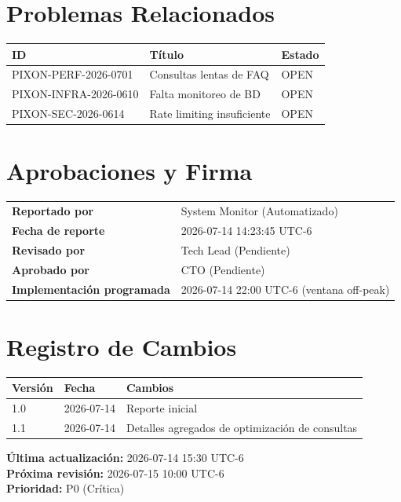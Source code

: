 \documentclass[12pt,a4paper]{article}
\begin{document}
\section{Problemas Relacionados}

\begin{table}[h]
\centering
\begin{tabular}{|l|l|l|}
\toprule
\textbf{ID} & \textbf{Título} & \textbf{Estado} \\
\midrule
PIXON-PERF-2026-0701 & Consultas lentas de FAQ & OPEN \\
PIXON-INFRA-2026-0610 & Falta monitoreo de BD & OPEN \\
PIXON-SEC-2026-0614 & Rate limiting insuficiente & OPEN \\
\bottomrule
\end{tabular}
\end{table}

\newpage

\section{Aprobaciones y Firma}

\begin{table}[h]
\centering
\begin{tabular}{|l|l|}
\toprule
\textbf{Reportado por} & System Monitor (Automatizado) \\
\textbf{Fecha de reporte} & 2026-07-14 14:23:45 UTC-6 \\
\textbf{Revisado por} & Tech Lead (Pendiente) \\
\textbf{Aprobado por} & CTO (Pendiente) \\
\textbf{Implementación programada} & 2026-07-14 22:00 UTC-6 (ventana off-peak) \\
\bottomrule
\end{tabular}
\end{table}

\newpage

\section{Registro de Cambios}

\begin{table}[h]
\centering
\begin{tabular}{|l|l|l|}
\toprule
\textbf{Versión} & \textbf{Fecha} & \textbf{Cambios} \\
\midrule
1.0 & 2026-07-14 & Reporte inicial \\
1.1 & 2026-07-14 & Detalles agregados de optimización de consultas \\
\bottomrule
\end{tabular}
\end{table}

\vspace{2cm}

\begin{center}
\textbf{Última actualización:} 2026-07-14 15:30 UTC-6 \\
\textbf{Próxima revisión:} 2026-07-15 10:00 UTC-6 \\
\textbf{Prioridad:} P0 (Crítica)
\end{center}
\end{document}
